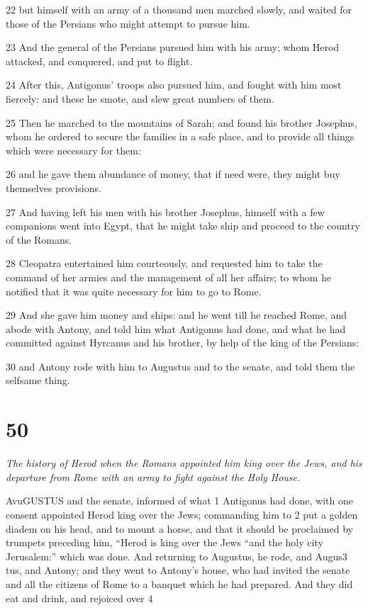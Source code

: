 22 but himself with an army of a thousand men marched slowly, and waited for those of the Persians who might attempt to pursue him. 

23 And the general of the Persians pursued him with his army; whom Herod attacked, and conquered, and put to flight. 

24 After this, Antigonus’ troops also pursued him, and fought with him most fiercely: and these he smote, and slew great numbers of them. 

25 Then he marched to the mountains of Sarah; and found his brother Josephus, whom he ordered to secure the families in a safe place, and to provide all things which were necessary for them: 

26 and he gave them abundance of money, that if need were, they might buy themselves provisions. 

27 And having left his men with his brother Josephus, himself with a few companions went into Egypt, that he might take ship and proceed to the country of the Romans. 

28 Cleopatra entertained him courteously, and requested him to take the command of her armies and the management of all her affairs; to whom he notified that it was quite necessary for him to go to Rome. 

29 And she gave him money and ships: and he went till he reached Rome, and abode with Antony, and told him what Antigonus had done, and what he had committed against Hyrcanus and his brother, by help of the king of the Persians: 

30 and Antony rode with him to Augustus and to the senate, and told them the selfsame thing. 

\chapter{50}

\par \textit{The history of Herod when the Romans appointed him king over the Jews, and his departure from Rome with an army to fight against the Holy House.}

AvuGUSTUS and the senate, informed of what 1 Antigonus had done, with one consent appointed Herod king over the Jews; commanding him to 2 put a golden diadem on his head, and to mount a horse, and that it should be proclaimed by trumpets preceding him, “Herod is king over the Jews “and the holy city Jerusalem:” which was done. And returning to Augustus, he rode, and Augus3 tus, and Antony; and they went to Antony’s house, who had invited the senate and all the citizens of Rome to a banquet which he had prepared. And they did eat and drink, and rejoiced over 4 

